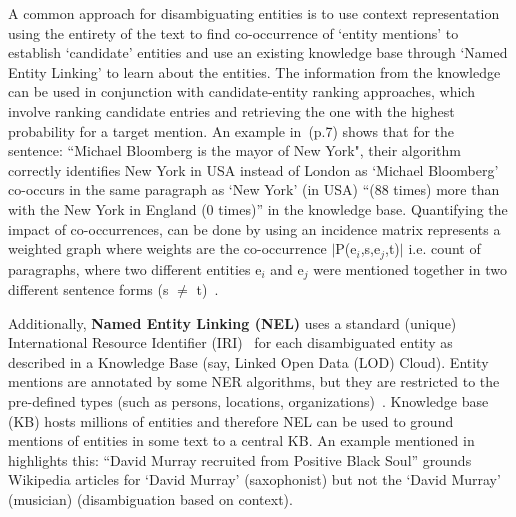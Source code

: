 A common approach for disambiguating entities is to use context representation using the entirety of the text to find co-occurrence of `entity mentions' to establish `candidate' entities and use an existing knowledge base through `Named Entity Linking' to learn about the entities. The information from the knowledge can be used in conjunction with candidate-entity ranking approaches, which involve ranking candidate entries and retrieving the one with the highest probability for a target mention. 
An example in~\cite{ned}(p.7) shows that for the sentence: ``Michael Bloomberg is the mayor of New York", their algorithm correctly identifies New York in USA instead of London as `Michael Bloomberg' co-occurs in the same paragraph as `New York' (in USA) ``(88 times) more than with the New York in England (0 times)'' in the knowledge base. Quantifying  the impact of co-occurrences, can be done by using an incidence matrix represents a weighted graph where weights are the co-occurrence $|$P(e$_{i}$,s,e$_{j}$,t)$|$ i.e. count of paragraphs, where two different entities e$_{i}$ and e$_{j}$ were mentioned together in two different sentence forms (s $\neq$ t)~\cite{ned}. 

Additionally, \textbf{Named Entity Linking (NEL)} uses a standard (unique) International Resource Identifier (IRI)~\cite{internationalized} for each disambiguated entity as described in a Knowledge Base (say, Linked Open Data (LOD) Cloud). Entity mentions are annotated by some NER algorithms, but they are restricted to the pre-defined types (such as persons, locations, organizations)~\cite{ieee_named_entity}. Knowledge base (KB) hosts millions of entities and therefore NEL can be used to ground mentions of entities in some text to a central KB. An example mentioned in~\cite{nel} highlights this: ``David Murray recruited from Positive Black Soul'' grounds Wikipedia articles for `David Murray' (saxophonist) but not the `David Murray' (musician) (disambiguation based on context). 
    



